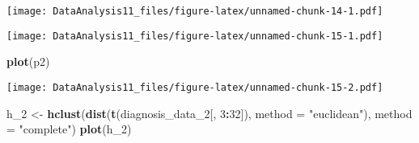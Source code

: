 \documentclass[]{article}
\newenvironment{Shaded}{\begin{snugshade}}{\end{snugshade}}
\newcommand{\KeywordTok}[1]{\textcolor[rgb]{0.13,0.29,0.53}{\textbf{#1}}}
\newcommand{\DataTypeTok}[1]{\textcolor[rgb]{0.13,0.29,0.53}{#1}}
\newcommand{\DecValTok}[1]{\textcolor[rgb]{0.00,0.00,0.81}{#1}}
\newcommand{\StringTok}[1]{\textcolor[rgb]{0.31,0.60,0.02}{#1}}
\newcommand{\OtherTok}[1]{\textcolor[rgb]{0.56,0.35,0.01}{#1}}
\newcommand{\OperatorTok}[1]{\textcolor[rgb]{0.81,0.36,0.00}{\textbf{#1}}}
\newcommand{\NormalTok}[1]{#1}
\begin{document}
\texttt{[image: DataAnalysis11\_files/figure-latex/unnamed-chunk-14-1.pdf]}

\begin{Shaded}
\end{Shaded}

\texttt{[image: DataAnalysis11\_files/figure-latex/unnamed-chunk-15-1.pdf]}

\begin{Shaded}
\begin{Highlighting}[]
\KeywordTok{plot}\NormalTok{(p2)}
\end{Highlighting}
\end{Shaded}

\texttt{[image: DataAnalysis11\_files/figure-latex/unnamed-chunk-15-2.pdf]}

\begin{Shaded}
\begin{Highlighting}[]
\NormalTok{h_}\DecValTok{2}\NormalTok{ <-}\StringTok{ }\KeywordTok{hclust}\NormalTok{(}\KeywordTok{dist}\NormalTok{(}\KeywordTok{t}\NormalTok{(diagnosis_data_}\DecValTok{2}\NormalTok{[, }\DecValTok{3}\OperatorTok{:}\DecValTok{32}\NormalTok{]), }\DataTypeTok{method =} \StringTok{"euclidean"}\NormalTok{), }\DataTypeTok{method =} \StringTok{"complete"}\NormalTok{)}
\KeywordTok{plot}\NormalTok{(h_}\DecValTok{2}\NormalTok{)}
\end{Highlighting}
\end{Shaded}
\end{document}
